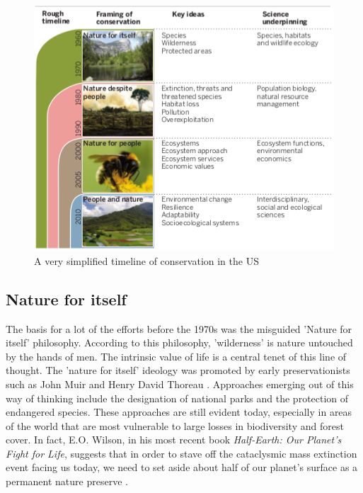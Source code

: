 \documentclass[rutwik_proposal.tex]{subfiles}
\begin{document}
\begin{figure}[h]
\centering
\includegraphics{Images/constimeline}
\caption{A very simplified timeline of conservation in the US\cite{Mace14}}
\label{fig:cons_timeline}
\end{figure}

\subsection{Nature for itself}\label{subsec:intrinsicvals}
The basis for a lot of the efforts before the 1970s was the misguided 'Nature for itself' philosophy. According to this philosophy, 'wilderness' is nature untouched by the hands of men. The intrinsic value of life is a central tenet of this line of thought. The 'nature for itself' ideology was promoted by early preservationists such as John Muir and Henry David Thoreau \cite{Muir1901, Thoreau06}. Approaches emerging out of this way of thinking include the designation of national parks and the protection of endangered species. These approaches are still evident today, especially in areas of the world that are most vulnerable to large losses in biodiversity and forest cover. In fact, E.O. Wilson, in his most recent book \textit{Half-Earth: Our Planet's Fight for Life}, suggests that in order to stave off the cataclysmic mass extinction event facing us today, we need to set aside about half of our planet's surface as a permanent nature preserve \cite{Wilson16}.
\end{document}
